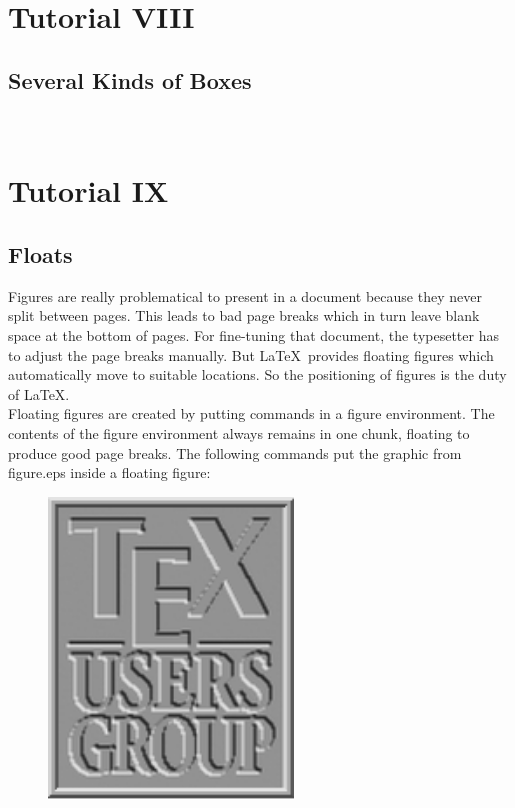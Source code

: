 \documentclass{article}
\theoremstyle{definition}
\theoremstyle{remark}
\theoremstyle{plain}
\numberwithin{equation}{subsection}
\begin{document}
{\newpage
\section{Tutorial VIII}
\subsection{Several Kinds of Boxes}
\\[6pt]
\setlength\fboxrule{2pt}\setlength\fboxsep{2mm}

\newpage
\section{Tutorial IX}
\subsection{Floats}
Figures are really problematical to present in a document because they never split between pages. This leads to bad page breaks which in turn leave blank space at the bottom of pages. For fine-tuning that document, the typesetter has to adjust the page breaks manually.
But \LaTeX\ provides floating figures which automatically move to suitable locations.
So the positioning of figures is the duty of \LaTeX.\\ 
Floating figures are created by putting commands in a figure environment. The contents of the figure environment always remains in one chunk, floating to produce good page breaks. The following commands put the graphic from figure.eps inside a floating
figure:\\
\begin{figure}[htbp]
	\centering
	\includegraphics[width=6.5cm]{picture/tex.png}

\end{figure}}
\end{document}
